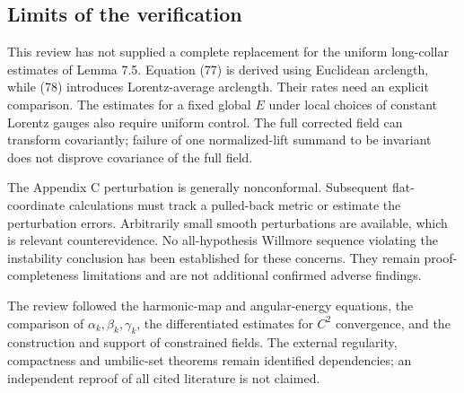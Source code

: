 \documentclass[10pt]{article}
\begin{document}
\subsection*{Limits of the verification}
This review has not supplied a complete replacement for the uniform long-collar estimates of Lemma 7.5. Equation (77) is derived using Euclidean arclength, while (78) introduces Lorentz-average arclength. Their rates need an explicit comparison. The estimates for a fixed global \(E\) under local choices of constant Lorentz gauges also require uniform control. The full corrected field can transform covariantly; failure of one normalized-lift summand to be invariant does not disprove covariance of the full field.\par
The Appendix C perturbation is generally nonconformal. Subsequent flat-coordinate calculations must track a pulled-back metric or estimate the perturbation errors. Arbitrarily small smooth perturbations are available, which is relevant counterevidence. No all-hypothesis Willmore sequence violating the instability conclusion has been established for these concerns. They remain proof-completeness limitations and are not additional confirmed adverse findings.\par
The review followed the harmonic-map and angular-energy equations, the comparison of \(\alpha_k,\beta_k,\gamma_k\), the differentiated estimates for \(C^2\) convergence, and the construction and support of constrained fields. The external regularity, compactness and umbilic-set theorems remain identified dependencies; an independent reproof of all cited literature is not claimed.\par
\end{document}
